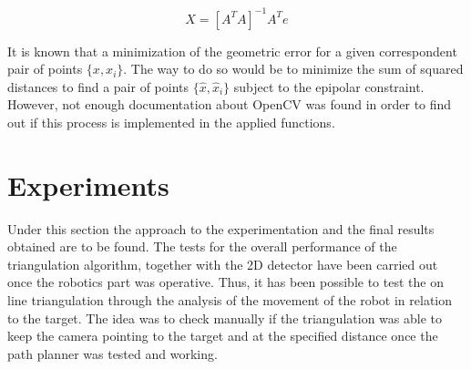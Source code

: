 \begin{equation}
	X = [A^{T}A]^{-1}A^{T}e
	\label{eq:LSM_solution}
\end{equation}

It is known that a minimization of the geometric error for a given correspondent pair of points $\{x, x_i\}$.
The way to do so would be to minimize the sum of squared distances to find a pair of points $\{\hat{x}, \hat{x}_i\}$ subject to the epipolar constraint.
However, not enough documentation about OpenCV was found in order to find out if this process is implemented in the applied functions.

\section{Experiments}
Under this section the approach to the experimentation and the final results obtained are to be found.
The tests for the overall performance of the triangulation algorithm, together with the 2D detector have been carried out once the robotics part was operative.
Thus, it has been possible to test the on line triangulation through the analysis of the movement of the robot in relation to the target.
The idea was to check manually if the triangulation was able to keep the camera pointing to the target and at the specified distance once the path planner was tested and working.




